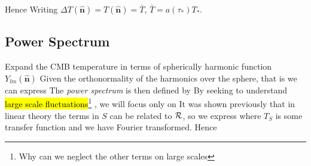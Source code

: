 \documentclass{article}
\begin{document}
Hence 
Writing $\Delta T(\hat{\bm{n}}) = T(\hat{\bm{n}}) = \bar{T}$, $\bar{T} = a(\tau_\ast) T_\ast$. 

\subsection{Power Spectrum}

Expand the CMB temperature in terms of spherically harmonic function $Y_{lm}(\hat{\bm{n}})$
Given the orthonormality of the harmonics over the sphere, that is 
we can express 
The \emph{power spectrum} is then defined by 
By seeking to understand \hl{large scale fluctuations}\footnote{Why can we neglect the other terms on large scales} , we will focus only on 
It was shown previously that in linear theory the terms in $S$ can be related to $\mathcal{R}$, so we express 
where $T_S$ is some transfer function and we have Fourier transformed. Hence 
\end{document}
